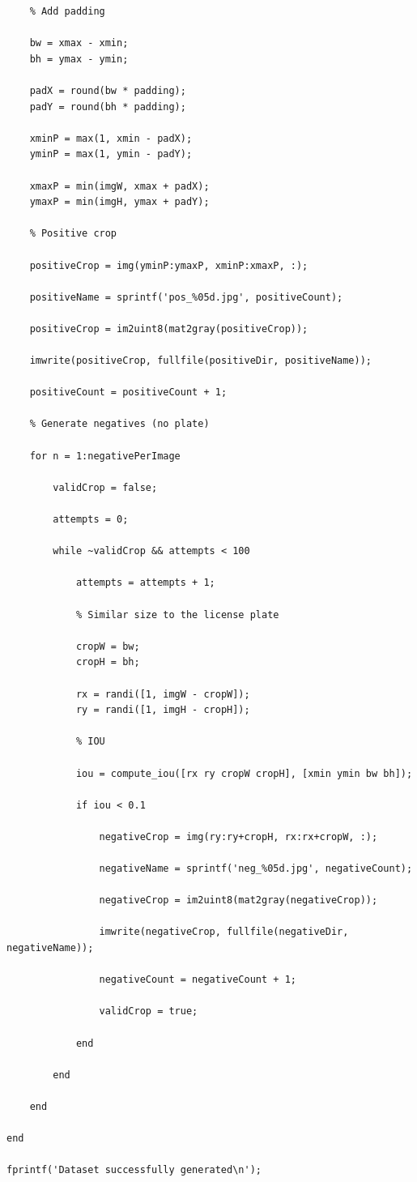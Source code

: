 \begin{verbatim}
    % Add padding

    bw = xmax - xmin;
    bh = ymax - ymin;

    padX = round(bw * padding);
    padY = round(bh * padding);

    xminP = max(1, xmin - padX);
    yminP = max(1, ymin - padY);

    xmaxP = min(imgW, xmax + padX);
    ymaxP = min(imgH, ymax + padY);

    % Positive crop

    positiveCrop = img(yminP:ymaxP, xminP:xmaxP, :);

    positiveName = sprintf('pos_%05d.jpg', positiveCount);

    positiveCrop = im2uint8(mat2gray(positiveCrop));

    imwrite(positiveCrop, fullfile(positiveDir, positiveName));

    positiveCount = positiveCount + 1;

    % Generate negatives (no plate)

    for n = 1:negativePerImage

        validCrop = false;

        attempts = 0;

        while ~validCrop && attempts < 100

            attempts = attempts + 1;

            % Similar size to the license plate

            cropW = bw;
            cropH = bh;

            rx = randi([1, imgW - cropW]);
            ry = randi([1, imgH - cropH]);

            % IOU

            iou = compute_iou([rx ry cropW cropH], [xmin ymin bw bh]);

            if iou < 0.1

                negativeCrop = img(ry:ry+cropH, rx:rx+cropW, :);

                negativeName = sprintf('neg_%05d.jpg', negativeCount);

                negativeCrop = im2uint8(mat2gray(negativeCrop));

                imwrite(negativeCrop, fullfile(negativeDir, negativeName));

                negativeCount = negativeCount + 1;

                validCrop = true;

            end

        end

    end

end

fprintf('Dataset successfully generated\n');
    
\end{verbatim}


